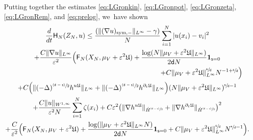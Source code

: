 \documentclass[10pt]{amsart}
\newcommand{\psfrac}[2]{\sfrac{(#1)}{#2}}
\newcommand{\sym}{\textup{sym}}
\theoremstyle{plain}
\theoremstyle{definition}
\DeclarePairedDelimiter{\pa}{\lparen}{\rparen}
\let\div\relax
\DeclareMathOperator{\div}{\mathrm{div}}
\let\ga\gamma
\let\vep\varepsilon
\let\p\partial
\let\ux X
\let\uz Z
\newcommand{\indic}{\mathbf{1}}
\newcommand{\Uu}{\mathfrak{U}}
\newcommand{\Fr}{\mathsf{F}}
\newcommand{\Hr}{\mathsf{H}}
\renewcommand{\d}{\mathsf{d}}
\newcommand{\s}{\mathsf{s}}
\begin{document}
Putting together the estimates \eqref{eq:LGronkin}, \eqref{eq:LGronpot}, \eqref{eq:LGronzeta}, \eqref{eq:LGronRem}, and \eqref{eq:prelog}, we~have shown
\begin{multline*}
\frac{d}{dt}\Hr_{N}(\uz_N,u) \leq \frac{(\|(\nabla u)_{\sym,-}\|_{L^\infty}-\ga)}{N}\sum_{i=1}^N |u(x_i)-v_i|^2 \\
+\frac{C\|\nabla u\|_{L^\infty}}{\vep^2}\Bigl(\Fr_N (\ux_N,\mu_V+\vep^2\Uu) + \frac{\log(N\|\mu_V+\vep^2\Uu\|_{L^\infty})}{2\d N}\indic_{\s=0}\\
\shoveright{+ C \|\mu_V+\vep^2\Uu\|_{L^\infty}^{\sfrac{\s}{\d}} N^{-1+\sfrac{\s}{\d}}\Bigr)}\\
+ C\pa*{\|(-\Delta)^{\psfrac{\d-\s}{2}}\div h^{u\Uu}\|_{L^\infty}+\|(-\Delta)^{\psfrac{\d-\s}{2}}h^{\p_t\Uu}\|_{L^\infty}}(N\|{\mu_V+\vep^2\Uu}\|_{L^\infty})^{\sfrac{\s}{\d}-1}\\
+ \frac{C\|u\|_{W^{1,\infty}}}{\vep^2N}\sum_{i=1}^N \zeta(x_i)+ C\vep^2\pa*{\|\nabla\div h^{u\Uu}\|_{\dot{H}^{\psfrac{\d-\s}{2}}}+ \|\nabla h^{\p_t\Uu}\|_{\dot{H}^{\psfrac{\d-\s}{2}}}}^2 \\
+ \frac{C}{\vep^2}\Big(\Fr_N(\ux_N,\mu_V+\vep^2\Uu) + \frac{\log(\|\mu_V+\vep^2\Uu\|_{L^\infty}N)}{2\d N}\indic_{\s=0} + C\|\mu_V+\vep^2\Uu\|_{L^\infty}^{\sfrac{\s}{\d}}N^{\sfrac{\s}{\d}-1}\Big).
\end{multline*}
\end{document}

